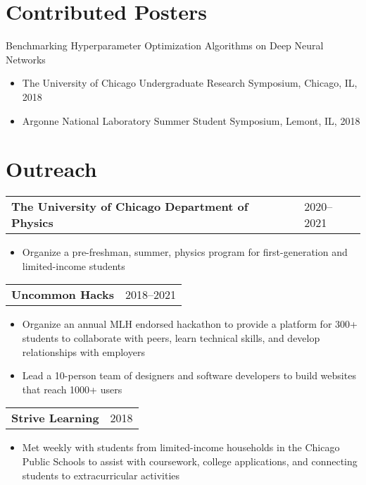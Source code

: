 \documentclass[letterpaper, 11pt]{article}
\begin{document}
\section{Contributed Posters}
Benchmarking Hyperparameter Optimization Algorithms on Deep Neural Networks\\
\begin{itemize}
\item The University of Chicago Undergraduate Research Symposium, Chicago, IL, 2018\\
\item Argonne National Laboratory Summer Student Symposium, Lemont, IL, 2018\\
\end{itemize}

\section{Outreach}
\begin{tabular}{@{} L{12cm} @{} R{4.51cm} @{}}
  \textbf{The University of Chicago Department of Physics} & 2020--2021\\
\end{tabular}
\begin{itemize}
\item Organize a pre-freshman, summer, physics program for first-generation and limited-income
  students
\end{itemize}

\begin{tabular}{@{} L{12cm} @{} R{4.51cm} @{}}
  \textbf{Uncommon Hacks} & 2018--2021\\
\end{tabular}
\begin{itemize}
\item Organize an annual MLH endorsed hackathon to provide a platform for 300+
  students to collaborate with peers, learn technical skills,
  and develop relationships with employers
\item Lead a 10-person team of designers and software developers
  to build websites that reach 1000+ users
\end{itemize}

\begin{tabular}{@{} L{12cm} @{} R{4.51cm} @{}}
  \textbf{Strive Learning} & 2018\\
\end{tabular}
\begin{itemize}
\item Met weekly with students from limited-income households in the Chicago Public Schools
  to assist with coursework, college applications, and connecting
  students to extracurricular activities
\end{itemize}
\end{document}
